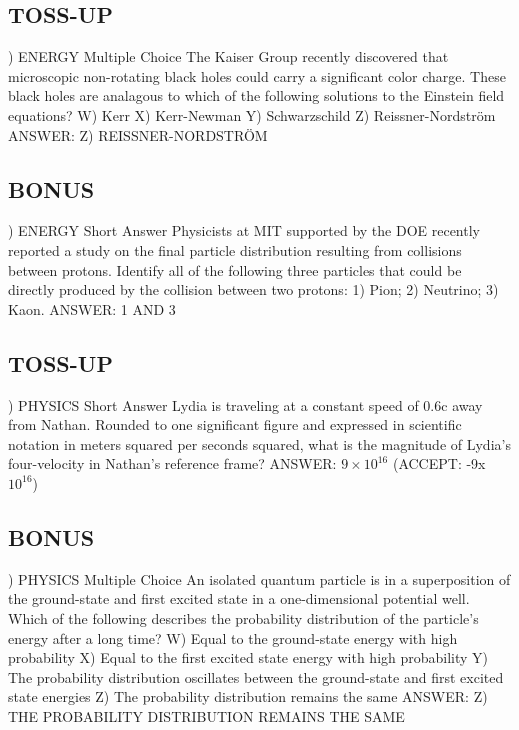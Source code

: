 \documentclass{article}
\begin{document}
\subsection*{TOSS-UP}
) ENERGY Multiple Choice The Kaiser Group recently discovered that microscopic non-rotating black holes could carry a significant color charge. These black holes are analagous to which of the following solutions to the Einstein field equations?
\noindent W) Kerr
\noindent X) Kerr-Newman
\noindent Y) Schwarzschild
\noindent Z) Reissner-Nordström
\noindent ANSWER: Z) REISSNER-NORDSTRÖM

\subsection*{BONUS}
) ENERGY Short Answer Physicists at MIT supported by the DOE recently reported a study on the final particle distribution resulting from collisions between protons. Identify all of the following three particles that could be directly produced by the collision between two protons: 1) Pion; 2) Neutrino; 3) Kaon.
\noindent ANSWER: 1 AND 3

\subsection*{TOSS-UP}
) PHYSICS Short Answer Lydia is traveling at a constant speed of 0.6c away from Nathan. Rounded to one significant figure and expressed in scientific notation in meters squared per seconds squared, what is the magnitude of Lydia's four-velocity in Nathan's reference frame?
\noindent ANSWER: $9\times10^{16}$ (ACCEPT: -9x $10^{16}$)

\subsection*{BONUS}
) PHYSICS Multiple Choice An isolated quantum particle is in a superposition of the ground-state and first excited state in a one-dimensional potential well. Which of the following describes the probability distribution of the particle's energy after a long time?
\noindent W) Equal to the ground-state energy with high probability
\noindent X) Equal to the first excited state energy with high probability
\noindent Y) The probability distribution oscillates between the ground-state and first excited state energies
\noindent Z) The probability distribution remains the same
\noindent ANSWER: Z) THE PROBABILITY DISTRIBUTION REMAINS THE SAME
\end{document}
